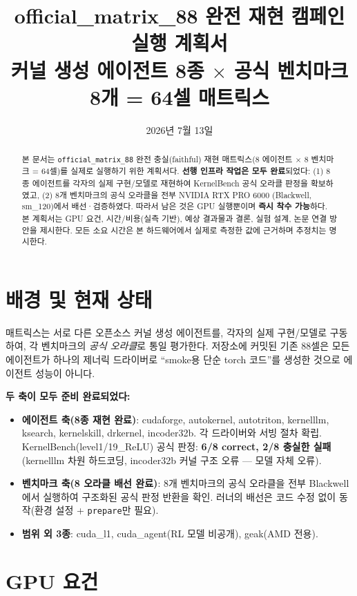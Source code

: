 \documentclass[11pt]{article}
\title{\textbf{official\_matrix\_88 완전 재현 캠페인 실행 계획서}\\[3pt]
\large 커널 생성 에이전트 8종 $\times$ 공식 벤치마크 8개 = 64셀 매트릭스}
\author{}
\date{2026년 7월 13일}
\newcommand{\code}[1]{\texttt{\small #1}}
\begin{document}
\maketitle

\begin{abstract}
\noindent
본 문서는 \code{official\_matrix\_88} 완전 충실(faithful) 재현 매트릭스(8 에이전트 $\times$ 8 벤치마크
= 64셀)를 실제로 실행하기 위한 계획서다. \textbf{선행 인프라 작업은 모두 완료}되었다:
(1) 8종 에이전트를 각자의 실제 구현/모델로 재현하여 KernelBench 공식 오라클 판정을 확보하였고,
(2) 8개 벤치마크의 공식 오라클을 전부 NVIDIA RTX PRO 6000 (Blackwell, sm\_120)에서 배선·검증하였다.
따라서 남은 것은 GPU 실행뿐이며 \textbf{즉시 착수 가능}하다. 본 계획서는 GPU 요건, 시간/비용(실측 기반),
예상 결과물과 결론, 실험 설계, 논문 연결 방안을 제시한다. 모든 소요 시간은 본 하드웨어에서 실제로
측정한 값에 근거하며 추정치는 명시한다.
\end{abstract}

\section{배경 및 현재 상태}
매트릭스는 서로 다른 오픈소스 커널 생성 에이전트를, 각자의 실제 구현/모델로 구동하여, 각 벤치마크의
\emph{공식 오라클}로 통일 평가한다. 저장소에 커밋된 기존 88셀은 모든 에이전트가 하나의 제너릭
드라이버로 ``smoke용 단순 torch 코드''를 생성한 것으로 에이전트 성능이 아니다.

\textbf{두 축이 모두 준비 완료되었다:}
\begin{itemize}
  \item \textbf{에이전트 축(8종 재현 완료)}: cudaforge, autokernel, autotriton, kernelllm, ksearch,
        kernelskill, drkernel, incoder32b. 각 드라이버와 서빙 절차 확립. KernelBench(level1/19\_ReLU)
        공식 판정: \textbf{6/8 correct, 2/8 충실한 실패}(kernelllm 차원 하드코딩, incoder32b 커널 구조
        오류 --- 모델 자체 오류).
  \item \textbf{벤치마크 축(8 오라클 배선 완료)}: 8개 벤치마크의 공식 오라클을 전부 Blackwell에서 실행하여
        구조화된 공식 판정 반환을 확인. 러너의 배선은 코드 수정 없이 동작(환경 설정 + \code{prepare}만 필요).
  \item \textbf{범위 외 3종}: cuda\_l1, cuda\_agent(RL 모델 비공개), geak(AMD 전용).
\end{itemize}

\section{GPU 요건}
\end{document}
